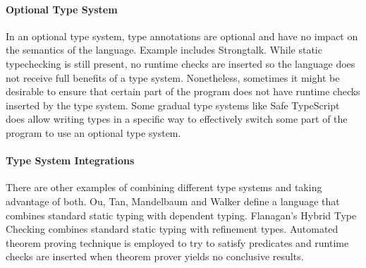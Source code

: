 \paragraph{Optional Type System}

In an optional type system\cite{bracha2004pluggable},
type annotations are optional and have no impact on the semantics of the language.
Example includes Strongtalk\cite{bracha1993strongtalk}.
While static typechecking is still present, no runtime checks are inserted
so the language does not receive full benefits of a type system.
Nonetheless, sometimes it might be desirable to ensure that certain part of the program
does not have runtime checks inserted by the type system.
Some gradual type systems like Safe TypeScript\cite{rastogi2015safe} does allow writing
types in a specific way to effectively switch some part of the program to use an optional type system.

\paragraph{Type System Integrations}

There are other examples of combining different type systems and taking advantage of both.
Ou, Tan, Mandelbaum and Walker\cite{ou2004dynamic} define a language that combines
standard static typing with dependent typing.
Flanagan's Hybrid Type Checking\cite{flanagan2006hybrid} combines standard static typing
with refinement types. Automated theorem proving technique is employed to try to satisfy predicates
and runtime checks are inserted when theorem prover yields no conclusive results.


